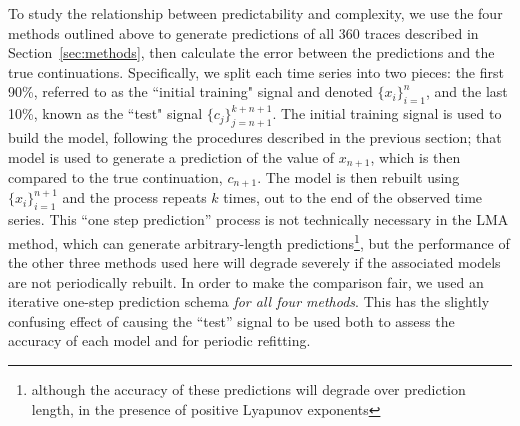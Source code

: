 To study the relationship between predictability and complexity, we
use the four methods outlined above to generate predictions of all 360
traces described in Section~\ref{sec:methods}, then calculate the
error between the predictions and the true continuations.
Specifically, we split each time series into two pieces: the first
90\%, referred to as the ``initial training" signal and denoted
$\{x_i\}_{i=1}^{n}$, and the last 10\%, known as the ``test" signal
$\{c_j\}_{j=n+1}^{k+n+1}$.  The initial training signal is used to
build the model, following the procedures described in the previous
section; that model is used to generate a prediction of the value of
$x_{n+1}$, which is then compared to the true continuation, $c_{n+1}$.
The model is then rebuilt using $\{x_i\}_{i=1}^{n+1}$ and the process
repeats $k$ times, out to the end of the observed time series.  This
``one step prediction'' process is not technically necessary in the
LMA method, which can generate arbitrary-length
predictions\footnote{although the accuracy of these predictions will
  degrade over prediction length, in the presence of positive Lyapunov
  exponents}, but the performance of the other three methods used here
will degrade severely if the associated models are not periodically
rebuilt.  In order to make the comparison fair, we used an iterative
one-step prediction schema {\sl for all four methods}.  This has the
slightly confusing effect of causing the ``test'' signal to be used
both to assess the accuracy of each model and for periodic refitting.

